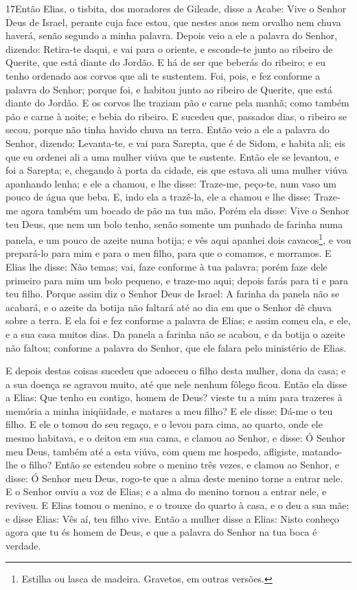 \medskip

\lettrine{17} Então Elias, o tisbita, dos moradores de
Gileade, disse a Acabe: Vive o Senhor Deus de Israel, perante cuja
face estou, que nestes anos nem orvalho nem chuva haverá, senão
segundo a minha palavra. Depois veio a ele a palavra do Senhor,
dizendo: Retira-te daqui, e vai para o oriente, e esconde-te
junto ao ribeiro de Querite, que está diante do Jordão. E há de
ser que beberás do ribeiro; e eu tenho ordenado aos corvos que ali
te sustentem. Foi, pois, e fez conforme a palavra do Senhor;
porque foi, e habitou junto ao ribeiro de Querite, que está diante
do Jordão. E os corvos lhe traziam pão e carne pela manhã; como
também pão e carne à noite; e bebia do ribeiro. E sucedeu que,
passados dias, o ribeiro se secou, porque não tinha havido chuva na
terra. Então veio a ele a palavra do Senhor, dizendo:
Levanta-te, e vai para Sarepta, que é de Sidom, e habita ali;
eis que eu ordenei ali a uma mulher viúva que te sustente.
Então ele se levantou, e foi a Sarepta; e, chegando à porta
da cidade, eis que estava ali uma mulher viúva apanhando lenha; e
ele a chamou, e lhe disse: Traze-me, peço-te, num vaso um pouco de
água que beba. E, indo ela a trazê-la, ele a chamou e lhe
disse: Traze-me agora também um bocado de pão na tua mão.
Porém ela disse: Vive o Senhor teu Deus, que nem um bolo
tenho, senão somente um punhado de farinha numa panela, e um pouco
de azeite numa botija; e vês aqui apanhei dois
cavacos\footnote{Estilha ou lasca de madeira. Gravetos, em outras
versões.}, e vou prepará-lo para mim e para o meu filho, para que o
comamos, e morramos. E Elias lhe disse: Não temas; vai, faze
conforme à tua palavra; porém faze dele primeiro para mim um bolo
pequeno, e traze-mo aqui; depois farás para ti e para teu filho.
Porque assim diz o Senhor Deus de Israel: A farinha da panela
não se acabará, e o azeite da botija não faltará até ao dia em que o
Senhor dê chuva sobre a terra. E ela foi e fez conforme a
palavra de Elias; e assim comeu ela, e ele, e a sua casa muitos
dias. Da panela a farinha não se acabou, e da botija o azeite
não faltou; conforme a palavra do Senhor, que ele falara pelo
ministério de Elias.

E depois destas coisas sucedeu que adoeceu o filho desta mulher,
dona da casa; e a sua doença se agravou muito, até que nele nenhum
fôlego ficou. Então ela disse a Elias: Que tenho eu contigo,
homem de Deus? vieste tu a mim para trazeres à memória a minha
iniqüidade, e matares a meu filho? E ele disse: Dá-me o teu
filho. E ele o tomou do seu regaço, e o levou para cima, ao quarto,
onde ele mesmo habitava, e o deitou em sua cama, e clamou ao
Senhor, e disse: Ó Senhor meu Deus, também até a esta viúva, com
quem me hospedo, afligiste, matando-lhe o filho? Então se
estendeu sobre o menino três vezes, e clamou ao Senhor, e disse: Ó
Senhor meu Deus, rogo-te que a alma deste menino torne a entrar
nele. E o Senhor ouviu a voz de Elias; e a alma do menino
tornou a entrar nele, e reviveu. E Elias tomou o menino, e o
trouxe do quarto à casa, e o deu a sua mãe; e disse Elias: Vês aí,
teu filho vive. Então a mulher disse a Elias: Nisto conheço
agora que tu és homem de Deus, e que a palavra do Senhor na tua boca
é verdade.

